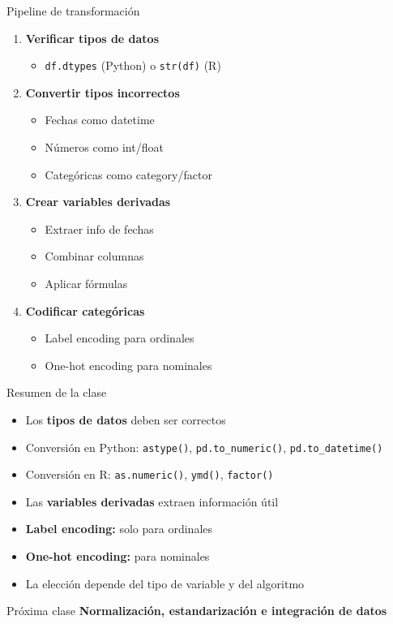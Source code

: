 \documentclass[aspectratio=169]{beamer}
\begin{document}
\begin{frame}{Pipeline de transformación}
\begin{enumerate}
    \item \textbf{Verificar tipos de datos}
    \begin{itemize}
        \item \texttt{df.dtypes} (Python) o \texttt{str(df)} (R)
    \end{itemize}
    
    \item \textbf{Convertir tipos incorrectos}
    \begin{itemize}
        \item Fechas como datetime
        \item Números como int/float
        \item Categóricas como category/factor
    \end{itemize}
    
    \item \textbf{Crear variables derivadas}
    \begin{itemize}
        \item Extraer info de fechas
        \item Combinar columnas
        \item Aplicar fórmulas
    \end{itemize}
    
    \item \textbf{Codificar categóricas}
    \begin{itemize}
        \item Label encoding para ordinales
        \item One-hot encoding para nominales
    \end{itemize}
\end{enumerate}
\end{frame}

\begin{frame}{Resumen de la clase}
\begin{itemize}
    \item Los \textbf{tipos de datos} deben ser correctos
    \item Conversión en Python: \texttt{astype()}, \texttt{pd.to\_numeric()}, \texttt{pd.to\_datetime()}
    \item Conversión en R: \texttt{as.numeric()}, \texttt{ymd()}, \texttt{factor()}
    \item Las \textbf{variables derivadas} extraen información útil
    \item \textbf{Label encoding:} solo para ordinales
    \item \textbf{One-hot encoding:} para nominales
    \item La elección depende del tipo de variable y del algoritmo
\end{itemize}

\vspace{1em}

\begin{block}{Próxima clase}
\textbf{Normalización, estandarización e integración de datos}
\end{block}
\end{frame}
\end{document}
